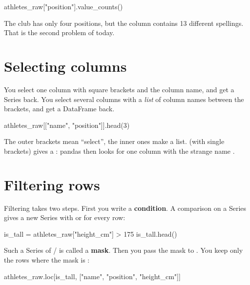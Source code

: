 \documentclass[11pt,a4paper]{article}
\begin{document}
\begin{python}
athletes_raw["position"].value_counts()
\end{python}

The club has only four positions, but the column contains 13 different
spellings. That is the second problem of today.

\section{Selecting columns}

You select one column with square brackets and the column name, and get
a Series back. You select several columns with a \emph{list} of column
names between the brackets, and get a DataFrame back.

\begin{python}
athletes_raw[["name", "position"]].head(3)
\end{python}

\begin{watchout}
The outer brackets mean ``select'', the inner ones make a list.
 (with single brackets) gives a
: pandas then looks for one column with the strange name
.
\end{watchout}

\section{Filtering rows}

Filtering takes two steps. First you write a \textbf{condition}. A
comparison on a Series gives a new Series with  or
 for every row:

\begin{python}
is_tall = athletes_raw["height_cm"] > 175
is_tall.head()
\end{python}

Such a Series of / is called a \textbf{mask}.
Then you pass the mask to . You keep only the rows where
the mask is :

\begin{python}
athletes_raw.loc[is_tall, ["name", "position", "height_cm"]]
\end{python}
\end{document}
